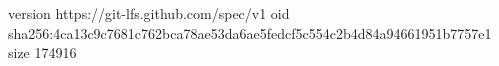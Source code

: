 version https://git-lfs.github.com/spec/v1
oid sha256:4ca13c9c7681c762bca78ae53da6ae5fedcf5c554c2b4d84a94661951b7757e1
size 174916

